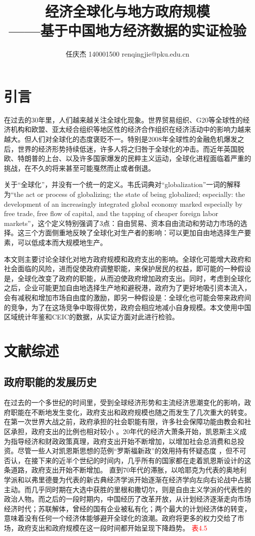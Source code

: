 \documentclass[10pt]{article}
\author{任庆杰  140001500  renqingjie@pku.edu.cn}
\title{经济全球化与地方政府规模\\
——基于中国地方经济数据的实证检验}
\begin{document}
\maketitle{}
\section{引言}
在过去的30年里，人们越来越关注全球化现象。世界贸易组织、G20等全球性的经济机构和欧盟、亚太经合组织等地区性的经济合作组织在经济活动中的影响力越来越大。但人们对全球化的态度褒贬不一。特别是2008年全球性的金融危机爆发之后，世界的经济形势持续低迷，许多人将之归咎于全球化的冲击。而近年英国脱欧、特朗普的上台、以及许多国家爆发的民粹主义运动，全球化进程面临着严重的挑战，在不久的将来甚至可能戛然而止或者倒退。

关于“全球化”，并没有一个统一的定义。韦氏词典对“globalization”一词的解释为“the act or process of globalizing; the state of being globalized; especially: the development of an increasingly integrated global economy marked especially by free trade, free flow of capital, and the tapping of cheaper foreign labor markets”，这个定义特别强调了3点：自由贸易、资本自由流动和劳动力市场的选择。这三个方面侧重地反映了全球化对生产者的影响：可以更加自由地选择生产要素，可以低成本而大规模地生产。

本文则主要讨论全球化对地方政府规模和政府支出的影响。全球化可能增大政府和社会面临的风险，进而促使政府调整职能，来保护居民的权益，即可能的一种假设是，全球化改变了政府的职能，从而迫使政府增加政府支出。同时，考虑到全球化之后，企业可能更加自由地选择生产地和避税港，政府为了更好地吸引资本流入，会有减税和增加市场自由度的激励，即另一种假设是：全球化也可能会带来政府间的竞争，为了在这场竞争中取得优势，政府会相应地减小自身规模。本文使用中国区域统计年鉴和CEIC的数据，从实证方面对此进行检验。

\section{文献综述}
\subsection{政府职能的发展历史}
在过去的一个多世纪的时间里，受到全球经济形势和主流经济思潮变化的影响，政府职能在不断地发生变化，政府支出和政府规模也随之而发生了几次重大的转变。在第一次世界大战之前，政府承担的社会职能有限，许多社会保障功能由教会和社区承担，政府支出的比例也相对较小 \cite{Beito2002The} 。20年代的经济大萧条开始，凯恩斯主义成为指导经济和财政政策真理，政府支出开始不断增加，以增加社会总消费和总投资。尽管一些人对凯恩斯思想的范例“罗斯福新政”的效用持有怀疑态度 \cite{rothbard1972america}，但不可否认，在接下来的近半个世纪的时间内，几乎所有的国家都在走着凯恩斯设计的这条道路，政府支出开始不断增加。
直到70年代的滞胀，以哈耶克为代表的奥地利学派和以弗里德曼为代表的新古典经济学派开始逐渐在经济学向左向右论战中占据主动。而几乎同时期在大选中获胜的里根和撒切尔，则是自由主义学派的代表性的政治人物。而之后的一段时期内，中国经历了改革开放，从计划经济逐渐走向市场经济时代；苏联解体，曾经的国有企业被私有化；两个最大的计划经济体的转变，意味着没有任何一个经济体能够避开全球化的浪潮。政府将更多的权力交给了市场，政府支出和政府规模在这一段时间都开始呈现下降趋势。
\textcolor{red}{表4.5}
\end{document}
